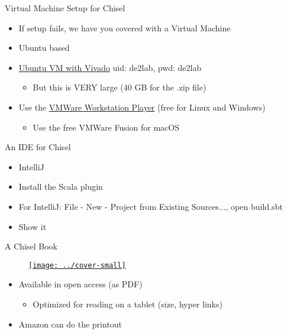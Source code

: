 \begin{frame}[fragile]{Virtual Machine Setup for Chisel}
\begin{itemize}
\item If setup fails, we have you covered with a Virtual Machine
\item Ubuntu based
\item \href{https://patmos-download.compute.dtu.dk/de2lab.zip}{Ubuntu VM with Vivado} uid: de2lab, pwd: de2lab
\begin{itemize}
\item But this is VERY large (40 GB for the .zip file)
\end{itemize}
\item Use the  \href{https://www.vmware.com/products/workstation-player.html} {VMWare Workstation Player} (free for Linux and Windows)
\begin{itemize}
\item Use the free VMWare Fusion for macOS
\end{itemize}
\end{itemize}
\end{frame}

\begin{frame}[fragile]{An IDE for Chisel}
\begin{itemize}
\item IntelliJ
\item Install the Scala plugin
\item For IntelliJ: File - New - Project from Existing Sources..., open build.sbt
\item Show it %
\end{itemize}
\end{frame}


\begin{frame}[fragile]{A Chisel Book}
\begin{figure}
    \centering
    \href{https://github.com/schoeberl/chisel-book}{\texttt{[image: ../cover-small]}}
\end{figure}

\begin{itemize}
\item Available in open access (as PDF)
\begin{itemize}
\item Optimized for reading on a tablet (size, hyper links)
\end{itemize}
\item Amazon can do the printout
\end{itemize}
\end{frame}

